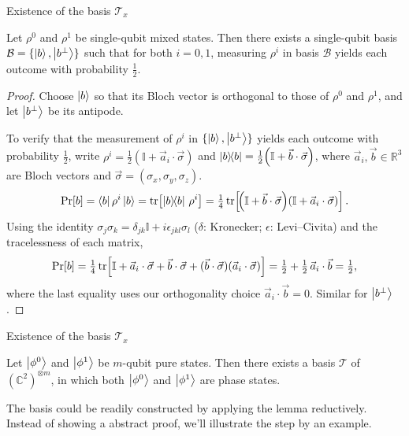 \begin{frame}{Existence of the basis $\mathcal{T}_x$}
    \begin{lemma}\label{lem:perpy}
        Let $\rho^0$ and $\rho^1$ be single-qubit mixed states. Then there exists a single-qubit basis $\mathcal{B} = \{\ket{b}, \ket{b^\bot}\}$ such that for both $i = 0, 1$, measuring $\rho^i$ in basis $\mathcal{B}$ yields each outcome with probability $\tfrac{1}{2}$.
    \end{lemma}

    \begin{proof}
        Choose $\ket{b}$ so that its Bloch vector is orthogonal to those of $\rho^0$ and $\rho^1$, and let $\ket{b^\bot}$ be its antipode.

        To verify that the measurement of $\rho^i$ in $\{\ket{b}, \ket{b^\bot}\}$ yields each outcome with probability $\tfrac{1}{2}$, 
        write $\rho^i = \tfrac{1}{2}\!\left(\mathbb{I} + \vec{a}_i\cdot\vec{\sigma}\right)$ and $\ketbra{b}{b} = \tfrac{1}{2}\!\left(\mathbb{I} + \vec{b}\cdot\vec{\sigma}\right)$, 
        where $\vec{a}_i, \vec{b} \in \mathbb{R}^3$ are Bloch vectors and $\vec{\sigma} = (\sigma_x, \sigma_y, \sigma_z)$.
        \vspace{-0.8em}
        \[
            \Pr[b] = \bra{b}\rho^i\ket{b} = \tr\!\left[\ketbra{b}{b}\,\rho^i\right] = \tfrac{1}{4}\tr\!\left[\!\left(\mathbb{I} + \vec{b}\cdot\vec{\sigma}\right)\!\left(\mathbb{I} + \vec{a}_i\cdot\vec{\sigma}\right)\right].
        \]
        Using the identity $\sigma_j\sigma_k = \delta_{jk}\mathbb{I} + i\epsilon_{jkl}\sigma_l$ ($\delta$: Kronecker; $\epsilon$: Levi--Civita) and the tracelessness of each matrix,
        \vspace{-0.8em}
        \[
            \Pr[b] = \tfrac{1}{4}\tr\!\left[\mathbb{I} + \vec{a}_i\cdot\vec{\sigma} + \vec{b}\cdot\vec{\sigma} + (\vec{b}\cdot\vec{\sigma})(\vec{a}_i\cdot\vec{\sigma})\right] = \tfrac{1}{2} + \tfrac{1}{2}\,\vec{a}_i\cdot\vec{b} = \tfrac{1}{2},
        \]
        where the last equality uses our orthogonality choice $\vec{a}_i\cdot\vec{b} = 0$. Similar for $\ket{b^\bot}$.
    \end{proof}
\end{frame}

\begin{frame}{Existence of the basis $\mathcal{T}_x$}
    \begin{center}
        
    \end{center}
    \begin{theorem}
        Let $\ket{\phi^0}$ and $\ket{\phi^1}$ be $m$-qubit pure states. Then there exists a basis $\mathcal{T}$ of $(\mathbb{C}^2)^{\otimes m}$, 
        in which both $\ket{\phi^0}$ and $\ket{\phi^1}$ are phase states.
    \end{theorem}
    The basis could be readily constructed by applying the lemma reductively. Instead of showing a abstract proof, we'll illustrate the step by an example. 
\end{frame}

